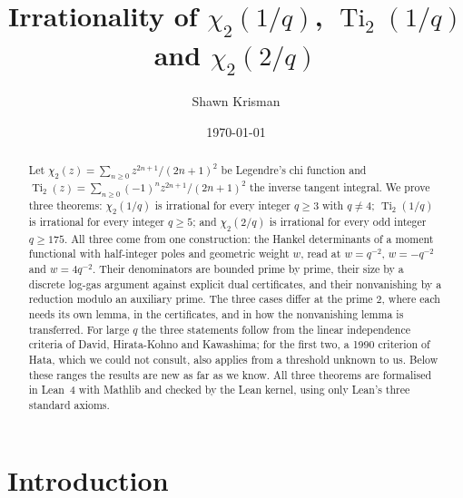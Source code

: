 \documentclass[11pt]{amsart}
\theoremstyle{definition}
\theoremstyle{remark}
\numberwithin{equation}{section}
\newcommand{\Ti}{\operatorname{Ti}}
\begin{document}
\title[Irrationality of $\chi_2(1/q)$, $\Ti_2(1/q)$ and $\chi_2(2/q)$]{Irrationality of $\chi_2(1/q)$, $\Ti_2(1/q)$ and
$\chi_2(2/q)$}

\author{Shawn Krisman}


\date{\today}

\begin{abstract}
Let $\chi_2(z)=\sum_{n\ge0}z^{2n+1}/(2n+1)^2$ be Legendre's chi function and
$\Ti_2(z)=\sum_{n\ge0}(-1)^nz^{2n+1}/(2n+1)^2$ the inverse tangent integral. We prove three theorems: $\chi_2(1/q)$ is
irrational for every integer $q\ge3$ with $q\ne4$; $\Ti_2(1/q)$ is irrational for every integer $q\ge5$; and
$\chi_2(2/q)$ is irrational for every odd integer $q\ge175$. All three come from one construction: the Hankel
determinants of a moment functional with half-integer poles and geometric weight $w$, read at $w=q^{-2}$, $w=-q^{-2}$
and $w=4q^{-2}$. Their denominators are bounded prime by prime, their size by a discrete log-gas argument against
explicit dual certificates, and their nonvanishing by a reduction modulo an auxiliary prime. The three cases differ at
the prime $2$, where each needs its own lemma, in the certificates, and in how the nonvanishing lemma is transferred.
For large $q$ the three statements follow from the linear independence criteria of David, Hirata-Kohno and Kawashima;
for the first two, a 1990 criterion of Hata, which we could not consult, also applies from a threshold unknown to us.
Below these ranges the results are new as far as we know.
All three theorems are formalised in Lean~4 with Mathlib and checked by the Lean kernel, using only
Lean's three standard axioms.
\end{abstract}

\maketitle

\tableofcontents

\section{Introduction}\label{sec:intro}
\end{document}
